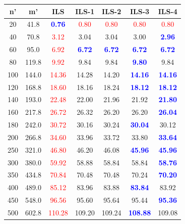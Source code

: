 \begin{tabular}{|cc|c|cccc|}
\hline
\rowcolor{gray!30} \textbf{n'} &  \textbf{m'} &  \textbf{ILS} &  \textbf{ILS-1} & \textbf{ILS-2} &  \textbf{ILS-3} &  \textbf{ILS-4}\\ \hline
20 & 41.8 & \textbf{\textcolor{blue}{0.76}} & \textcolor{red}{0.80} & \textcolor{red}{0.80} & \textcolor{red}{0.80} & \textcolor{red}{0.80}\\
40 & 70.8 & \textcolor{red}{3.12} & 3.04 & 3.04 & 3.00 & \textbf{\textcolor{blue}{2.96}}\\
60 & 95.0 & \textcolor{red}{6.92} & \textbf{\textcolor{blue}{6.72}} & \textbf{\textcolor{blue}{6.72}} & \textbf{\textcolor{blue}{6.72}} & \textbf{\textcolor{blue}{6.72}}\\
80 & 119.8 & \textcolor{red}{9.92} & 9.84 & 9.84 & \textbf{\textcolor{blue}{9.80}} & 9.84\\
100 & 144.0 & \textcolor{red}{14.36} & 14.28 & 14.20 & \textbf{\textcolor{blue}{14.16}} & \textbf{\textcolor{blue}{14.16}}\\
120 & 168.8 & \textcolor{red}{18.60} & 18.16 & 18.24 & \textbf{\textcolor{blue}{18.12}} & \textbf{\textcolor{blue}{18.12}}\\
140 & 193.0 & \textcolor{red}{22.48} & 22.00 & 21.96 & 21.92 & \textbf{\textcolor{blue}{21.80}}\\
160 & 217.8 & \textcolor{red}{26.72} & 26.32 & 26.20 & 26.20 & \textbf{\textcolor{blue}{26.04}}\\
180 & 242.0 & \textcolor{red}{30.72} & 30.16 & 30.24 & \textbf{\textcolor{blue}{30.04}} & 30.12\\
200 & 266.8 & \textcolor{red}{34.60} & 33.96 & 33.72 & 33.80 & \textbf{\textcolor{blue}{33.64}}\\
250 & 321.0 & \textcolor{red}{46.80} & 46.20 & 46.08 & \textbf{\textcolor{blue}{45.96}} & \textbf{\textcolor{blue}{45.96}}\\
300 & 380.0 & \textcolor{red}{59.92} & 58.88 & 58.84 & 58.84 & \textbf{\textcolor{blue}{58.76}}\\
350 & 434.8 & \textcolor{red}{70.84} & 70.48 & 70.48 & 70.24 & \textbf{\textcolor{blue}{70.20}}\\
400 & 489.0 & \textcolor{red}{85.12} & 83.96 & 83.88 & \textbf{\textcolor{blue}{83.84}} & 83.92\\
450 & 548.0 & \textcolor{red}{96.56} & 95.60 & 95.64 & 95.44 & \textbf{\textcolor{blue}{95.36}}\\
500 & 602.8 & \textcolor{red}{110.28} & 109.20 & 109.24 & \textbf{\textcolor{blue}{108.88}} & 109.08\\
\hline
\end{tabular}%
